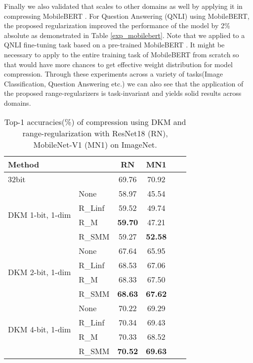 \documentclass[10pt,twocolumn,letterpaper]{article}
\begin{document}
Finally we also validated that  scales to other domains as well by applying it in compressing MobileBERT \cite{sun2020mobilebert}. For Question Answering (QNLI) \cite{rajpurkar2016squad} using MobileBERT, the proposed regularization improved the performance of the model by 2\% absolute as demonstrated in Table \ref{exp_mobilebert}. Note that we applied  to a QNLI fine-tuning task based on a pre-trained MobileBERT \cite{wolf2020transformers}. It might be necessary to apply  to the entire training task of MobileBERT from scratch so that  would have more chances to get effective weight distribution for model compression. Through these experiments across a variety of tasks(Image Classification, Question Answering etc.) we can also see that the application of the proposed range-regularizers is task-invariant and yields solid results across domains.

\begin{table}[t]
\caption{Top-1 accuracies(\%) of compression using DKM and range-regularization with ResNet18 (RN), MobileNet-V1 (MN1) on ImageNet.} \label{table_comp_exp}
\vskip 0.15in
\begin{center}
\begin{small}
\begin{sc}
\begin{tabular}{llcccc}
\toprule
Method &  & RN & MN1\\
\midrule
32bit &   & 69.76 & 70.92\\


\midrule
\multirow{4}{*}{DKM 1-bit, 1-dim}    & None        & 58.97 & 45.54\\
                        & R\_Linf    & 59.52 & 49.74 \\
                        & R\_M    &  \textbf{59.70} & 47.21\\
                        & R\_SMM    & 59.27 & \textbf{52.58} \\
                        \midrule
\multirow{4}{*}{DKM 2-bit, 1-dim}    & None     & 67.64 & 65.95 \\
                                     & R\_Linf  & 68.53 & 67.06 \\
                                     & R\_M     & 68.33 & 67.50 \\
                                     & R\_SMM   & \textbf{68.63} & \textbf{67.62} \\
                        \midrule
\multirow{4}{*}{DKM 4-bit, 1-dim}    
                        & None     & 70.22 & 69.29 \\
                        & R\_Linf    & 70.34 & 69.43 \\
                        & R\_M    & 70.33 & 68.52 \\
                        & R\_SMM    & \textbf{70.52} & \textbf{69.63} \\
\bottomrule
\end{tabular}
\end{sc}
\end{small}
\end{center}
\vskip -0.1in
\end{table}
\end{document}
